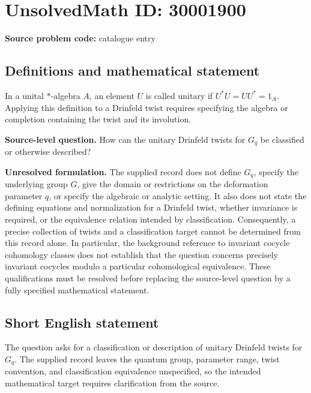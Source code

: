 \documentclass[11pt]{article}
\begin{document}
\section*{UnsolvedMath ID: 30001900}
\textbf{Source problem code:} catalogue entry
\subsection{Definitions and mathematical statement}
In a unital \(*\)-algebra \(A\), an element \(U\) is called unitary if \(U^*U=UU^*=1_A\). Applying this definition to a Drinfeld twist requires specifying the algebra or completion containing the twist and its involution.

\textbf{Source-level question.} How can the unitary Drinfeld twists for \(G_q\) be classified or otherwise described?

\textbf{Unresolved formulation.} The supplied record does not define \(G_q\), specify the underlying group \(G\), give the domain or restrictions on the deformation parameter \(q\), or specify the algebraic or analytic setting. It also does not state the defining equations and normalization for a Drinfeld twist, whether invariance is required, or the equivalence relation intended by classification. Consequently, a precise collection of twists and a classification target cannot be determined from this record alone. In particular, the background reference to invariant cocycle cohomology classes does not establish that the question concerns precisely invariant cocycles modulo a particular cohomological equivalence. These qualifications must be resolved before replacing the source-level question by a fully specified mathematical statement.
\subsection{Short English statement}
The question asks for a classification or description of unitary Drinfeld twists for \(G_q\). The supplied record leaves the quantum group, parameter range, twist convention, and classification equivalence unspecified, so the intended mathematical target requires clarification from the source.
\end{document}
